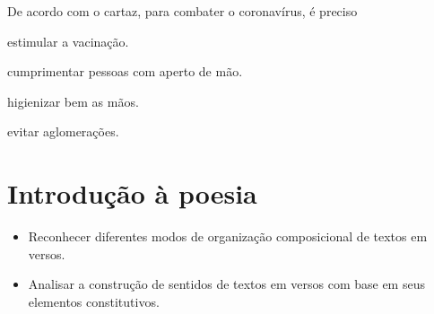 De acordo com o cartaz, para combater o coronavírus, é preciso

\begin{minipage}{.5\textwidth}
\begin{escolha}
\item estimular a vacinação.

\item cumprimentar pessoas com aperto de mão.

\item higienizar bem as mãos.

\item evitar aglomerações.
\end{escolha}
\end{minipage}

\chapter{Introdução à poesia}

\vspace*{-1cm}


\begin{itemize}
\item Reconhecer diferentes modos de organização composicional de textos em
versos.

\item Analisar a construção de sentidos de textos em versos com base em seus
elementos constitutivos.
\end{itemize}

